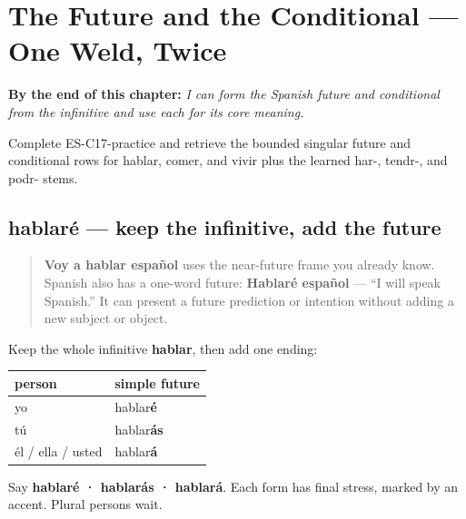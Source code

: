 
\chapter{The Future and the Conditional --- One Weld, Twice}
\label{ch:future-conditional}

\begin{chapteropening}
\textbf{By the end of this chapter:} \emph{I can form the Spanish future and conditional from the infinitive and use each for its core meaning.}

Complete ES-C17-practice and retrieve the bounded singular future and conditional rows for hablar, comer, and vivir plus the learned har-, tendr-, and podr- stems.
\end{chapteropening}

\section[hablaré]{hablaré — keep the infinitive, add the future}

\label{lesson:ES-C17-futuro}



\begin{quote}
\textbf{Voy a hablar español} uses the near-future frame you already know. Spanish also has a one-word future: \textbf{Hablaré español} — “I will speak Spanish.” It can present a future prediction or intention without adding a new subject or object.
\end{quote}

\begin{grammarlens}[title={Grammar Lens: three familiar persons}]
Keep the whole infinitive \textbf{hablar}, then add one ending:

\noindent
\begin{tabularx}{\linewidth}{@{}>{\raggedright\arraybackslash}X>{\raggedright\arraybackslash}X@{}}
\toprule
\textbf{person} & \textbf{simple future} \\
\midrule
yo & hablar\textbf{é} \\
tú & hablar\textbf{ás} \\
él / ella / usted & hablar\textbf{á} \\
\bottomrule
\end{tabularx}

Say \textbf{hablaré · hablarás · hablará}. Each form has final stress, marked by an accent. Plural persons wait.
\end{grammarlens}

